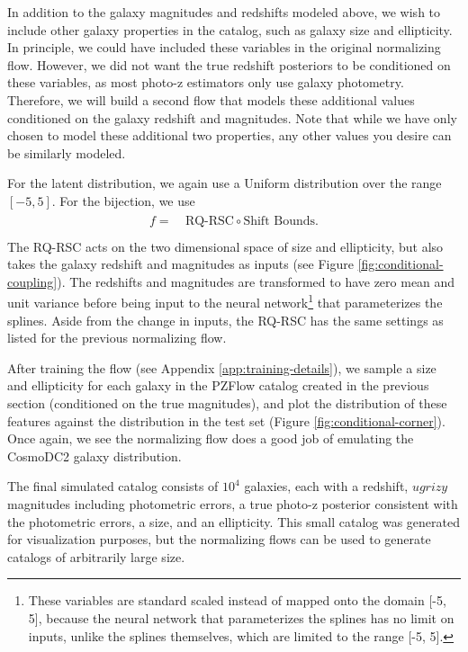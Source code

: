 \documentclass[twocolumn,twocolappendix]{aastex631}
\begin{document}
In addition to the galaxy magnitudes and redshifts modeled above, we wish to include other galaxy properties in the catalog, such as galaxy size and ellipticity.
In principle, we could have included these variables in the original normalizing flow.
However, we did not want the true redshift posteriors to be conditioned on these variables, as most photo-z estimators only use galaxy photometry.
Therefore, we will build a second flow that models these additional values conditioned on the galaxy redshift and magnitudes.
Note that while we have only chosen to model these additional two properties, any other values you desire can be similarly modeled.

For the latent distribution, we again use a Uniform distribution over the range $[-5, 5]$.
For the bijection, we use
\begin{align}
    \begin{split}
        f =& ~ \text{RQ-RSC} \circ \text{Shift Bounds}. \\
    \end{split}
\end{align}
The RQ-RSC acts on the two dimensional space of size and ellipticity, but also takes the galaxy redshift and magnitudes as inputs (see Figure \ref{fig:conditional-coupling}).
The redshifts and magnitudes are transformed to have zero mean and unit variance before being input to the neural network\footnote{These variables are standard scaled instead of mapped onto the domain [-5, 5], because the neural network that parameterizes the splines has no limit on inputs, unlike the splines themselves, which are limited to the range [-5, 5].} that parameterizes the splines.
Aside from the change in inputs, the RQ-RSC has the same settings as listed for the previous normalizing flow.

After training the flow (see Appendix \ref{app:training-details}), we sample a size and ellipticity for each galaxy in the PZFlow catalog created in the previous section (conditioned on the true magnitudes), and plot the distribution of these features against the distribution in the test set (Figure \ref{fig:conditional-corner}).
Once again, we see the normalizing flow does a good job of emulating the CosmoDC2 galaxy distribution.

The final simulated catalog consists of $10^4$ galaxies, each with a redshift, $ugrizy$ magnitudes including photometric errors, a true photo-z posterior consistent with the photometric errors, a size, and an ellipticity.
This small catalog was generated for visualization purposes, but the normalizing flows can be used to generate catalogs of arbitrarily large size.
\end{document}
